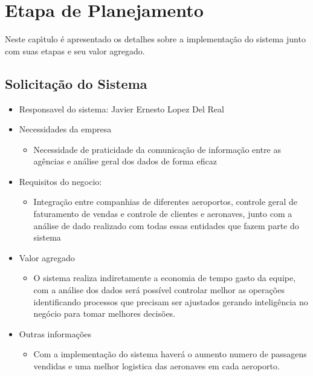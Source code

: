 
\chapter{Etapa de Planejamento}


Neste cap\'{\i}tulo \'{e} apresentado os detalhes sobre a implementação
do sistema junto com suas etapas e seu valor agregado.



\section{Solicita\c{c}\~{a}o do Sistema}

\begin{itemize}
       \item Responsavel do sistema: Javier Ernesto Lopez Del Real
       \item Necessidades da empresa
       \begin{itemize}
              \item Necessidade de praticidade da comunicação de informação entre as agências e análise geral dos dados de forma eficaz
       \end{itemize}
       \item Requisitos do negocio:
       \begin{itemize}
              \item Integração entre companhias de diferentes aeroportos, controle geral de faturamento de vendas e controle de clientes e aeronaves, junto com a análise de dado realizado com todas essas entidades que fazem parte do sistema
       \end{itemize}
       \item Valor agregado
       \begin{itemize}
              \item O sistema realiza indiretamente a economia de tempo gasto da equipe, com a análise dos dados será possível controlar melhor as operações identificando processos que precisam ser ajustados gerando inteligência no negócio para tomar melhores decisões. 
       \end{itemize}
       \item Outras informações
       \begin{itemize}
              \item Com a implementação do sistema haverá o aumento
               numero de passagens vendidas e uma melhor logistica das aeronaves
               em cada aeroporto.
              
       \end{itemize}
\end{itemize}


